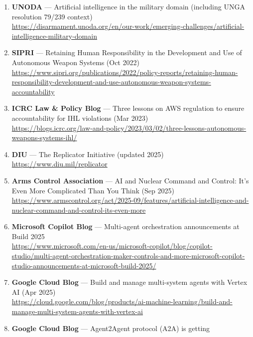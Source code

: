 \documentclass[
]{article}
\begin{document}
\begin{enumerate}
  Responsible Military Use of Artificial Intelligence and Autonomy
  (updated 2024 context)\\
  \url{https://www.state.gov/bureau-of-arms-control-deterrence-and-stability/political-declaration-on-responsible-military-use-of-artificial-intelligence-and-autonomy}
\item
  \textbf{UNODA} --- Artificial intelligence in the military domain
  (including UNGA resolution 79/239 context)\\
  \url{https://disarmament.unoda.org/en/our-work/emerging-challenges/artificial-intelligence-military-domain}
\item
  \textbf{SIPRI} --- Retaining Human Responsibility in the Development
  and Use of Autonomous Weapon Systems (Oct 2022)\\
  \url{https://www.sipri.org/publications/2022/policy-reports/retaining-human-responsibility-development-and-use-autonomous-weapon-systems-accountability}
\item
  \textbf{ICRC Law \& Policy Blog} --- Three lessons on AWS regulation
  to ensure accountability for IHL violations (Mar 2023)\\
  \url{https://blogs.icrc.org/law-and-policy/2023/03/02/three-lessons-autonomous-weapons-systems-ihl/}
\item
  \textbf{DIU} --- The Replicator Initiative (updated 2025)\\
  \url{https://www.diu.mil/replicator}
\item
  \textbf{Arms Control Association} --- AI and Nuclear Command and
  Control: It's Even More Complicated Than You Think (Sep 2025)\\
  \url{https://www.armscontrol.org/act/2025-09/features/artificial-intelligence-and-nuclear-command-and-control-its-even-more}
\item
  \textbf{Microsoft Copilot Blog} --- Multi-agent orchestration
  announcements at Build 2025\\
  \url{https://www.microsoft.com/en-us/microsoft-copilot/blog/copilot-studio/multi-agent-orchestration-maker-controls-and-more-microsoft-copilot-studio-announcements-at-microsoft-build-2025/}
\item
  \textbf{Google Cloud Blog} --- Build and manage multi-system agents
  with Vertex AI (Apr 2025)\\
  \url{https://cloud.google.com/blog/products/ai-machine-learning/build-and-manage-multi-system-agents-with-vertex-ai}
\item
  \textbf{Google Cloud Blog} --- Agent2Agent protocol (A2A) is getting

\end{enumerate}
\end{document}
